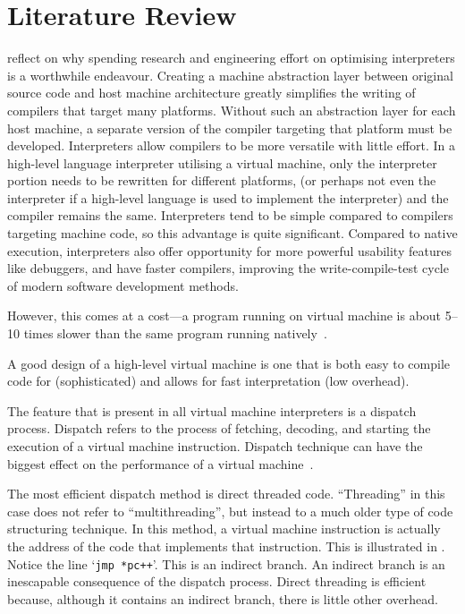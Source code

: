 	\section{Literature Review}
		\cite{structureinterpreters} reflect on why spending research and engineering effort on optimising interpreters is a worthwhile endeavour. Creating a machine abstraction layer between original source code and host machine architecture greatly simplifies the writing of compilers that target many platforms. Without such an abstraction layer for each host machine, a separate version of the compiler targeting that platform must be developed. Interpreters allow compilers to be more versatile with little effort. In a high-level language interpreter utilising a virtual machine, only the interpreter portion needs to be rewritten for different platforms, (or perhaps not even the interpreter if a high-level language is used to implement the interpreter) and the compiler remains the same. Interpreters tend to be simple compared to compilers targeting machine code, so this advantage is quite significant. Compared to native execution, interpreters also offer opportunity for more powerful usability features like debuggers, and have faster compilers, improving the write-compile-test cycle of modern software development methods.
		
		However, this comes at a cost---a program running on virtual machine is about 5--10 times slower than the same program running natively~\citep{optimizingindirectbranch}.
		
		A good design of a high-level virtual machine is one that is both easy to compile code for (sophisticated) and allows for fast interpretation (low overhead).
		
		The feature that is present in all virtual machine interpreters is a dispatch process. Dispatch refers to the process of fetching, decoding, and starting the execution of a virtual machine instruction. Dispatch technique can have the biggest effect on the performance of a virtual machine~\citep{structureinterpreters}.
		
		The most efficient dispatch method is direct threaded code. ``Threading'' in this case does not refer to ``multithreading'', but instead to a much older type of code structuring technique. In this method, a virtual machine instruction is actually the address of the code that implements that instruction. This is illustrated in . Notice the line `\texttt{jmp *pc++}'. This is an indirect branch. An indirect branch is an inescapable consequence of the dispatch process. Direct threading is efficient because, although it contains an indirect branch, there is little other overhead.
		
